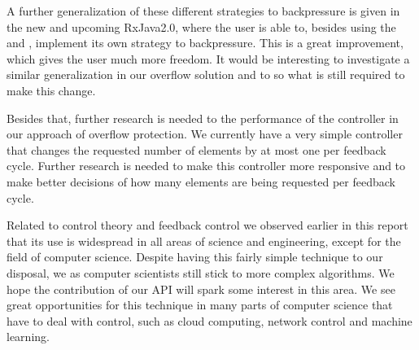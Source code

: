 A further generalization of these different strategies to backpressure is given in the new and upcoming RxJava2.0, where the user is able to, besides using the  and , implement its own strategy to backpressure. This is a great improvement, which gives the user much more freedom. It would be interesting to investigate a similar generalization in our overflow solution and to so what is still required to make this change.

Besides that, further research is needed to the performance of the controller in our approach of overflow protection. We currently have a very simple controller that changes the requested number of elements by at most one per feedback cycle. Further research is needed to make this controller more responsive and to make better decisions of how many elements are being requested per feedback cycle.

Related to control theory and feedback control we observed earlier in this report that its use is widespread in all areas of science and engineering, except for the field of computer science. Despite having this fairly simple technique to our disposal, we as computer scientists still stick to more complex algorithms. We hope the contribution of our API will spark some interest in this area. We see great opportunities for this technique in many parts of computer science that have to deal with control, such as cloud computing, network control and machine learning.

